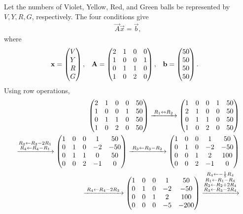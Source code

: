 \begin{enumerate}[label=\thesubsection.\arabic*, ref=\thesubsection.\theenumi,itemsep=0pt]
\begin{enumerate}
\end{enumerate}
%
\solution
Let the numbers of Violet, Yellow, Red, and Green balls be represented by
\(V,Y,R,G\), respectively. The four conditions give
\begin{align}
\vec{A}\vec{x}=\vec{b},
\end{align}
where
\begin{align}
\mathbf{x}&=\begin{pmatrix}V\\Y\\R\\G\end{pmatrix}, &
\mathbf{A}&=\begin{pmatrix}2&1&0&0\\1&0&0&1\\0&1&1&0\\1&0&2&0\end{pmatrix}, &
\mathbf{b}&=\begin{pmatrix}50\\50\\50\\50\end{pmatrix}.
\end{align}
Using row operations,
\begin{align*}
\myvec{
2&1&0&0&50\\
1&0&0&1&50\\
0&1&1&0&50\\
1&0&2&0&50
}
\xrightarrow{\;R_1\leftrightarrow R_2\;}
\myvec{
1&0&0&1&50\\
2&1&0&0&50\\
0&1&1&0&50\\
1&0&2&0&50
}
\\
\xrightarrow{\substack{R_2\leftarrow R_2-2R_1\\R_4\leftarrow R_4-R_1}}
\myvec{
1&0&0&1&50\\
0&1&0&-2&-50\\
0&1&1&0&50\\
0&0&2&-1&0
}
\xrightarrow{\;R_3\leftarrow R_3-R_2\;}
\myvec{
1&0&0&1&50\\
0&1&0&-2&-50\\
0&0&1&2&100\\
0&0&2&-1&0
}
\\
\xrightarrow{\;R_4\leftarrow R_4-2R_3\;}
\myvec{
1&0&0&1&50\\
0&1&0&-2&-50\\
0&0&1&2&100\\
0&0&0&-5&-200
}
\xrightarrow{\substack{R_4\leftarrow-\frac15R_4\\R_1\leftarrow R_1-R_4\\R_2\leftarrow R_2+2R_4\\R_3\leftarrow R_3-2R_4}}

\end{align*}
\end{enumerate}

